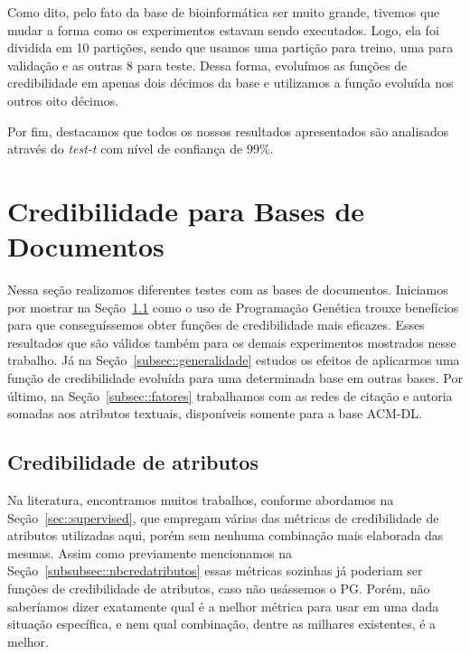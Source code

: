 Como dito, pelo fato da base de bioinformática ser muito grande, tivemos que mudar a forma como os experimentos estavam sendo executados. Logo, ela foi dividida em 10 partições, sendo que usamos uma partição para treino, uma para validação e as outras 8 para teste. Dessa forma, evoluímos as funções de credibilidade em apenas dois décimos da base e utilizamos a função evoluída nos outros oito décimos.

Por fim, destacamos que todos os nossos resultados apresentados são analisados através do \textit{test-t} com nível de confiança de 99\%.


\section{Credibilidade para Bases de Documentos}
\label{sec::documentos}

Nessa seção realizamos diferentes testes com as bases de documentos.
Iniciamos por mostrar na Seção~\ref{subsec::ganhosgp} como o uso de Programação Genética trouxe benefícios para que conseguíssemos obter funções de credibilidade mais eficazes. Esses 
resultados que são válidos também para os demais experimentos mostrados nesse trabalho. 
Já na Seção~\ref{subsec::generalidade} estudos os efeitos de aplicarmos uma função de credibilidade evoluída para uma determinada base em outras bases.
Por último, na Seção~\ref{subsec::fatores} trabalhamos com as redes de citação e autoria somadas aos atributos textuais, disponíveis somente para a base \textsc{ACM-DL}.

\subsection{Credibilidade de atributos}
\label{subsec::ganhosgp}

Na literatura, encontramos muitos trabalhos, conforme abordamos na Seção~\ref{sec::supervised}, que empregam várias das métricas de credibilidade de atributos utilizadas aqui, porém sem nenhuma combinação mais elaborada das mesmas. 
Assim como previamente mencionamos na Seção~\ref{subsubsec::nbcredatributos} essas métricas sozinhas já poderiam ser funções de credibilidade de atributos, caso não usássemos o \textsc{PG}. Porém, não saberíamos dizer exatamente qual é a melhor métrica para usar em uma dada situação específica, e nem qual combinação, dentre as milhares existentes, é a melhor. 

